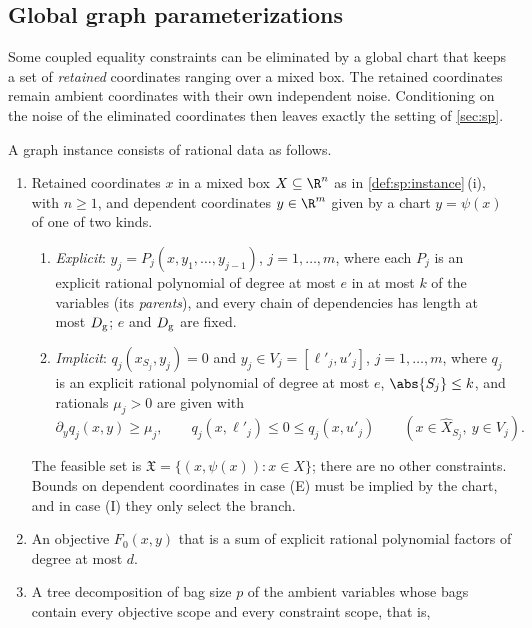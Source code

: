 \subsection{Global graph parameterizations}\label{sec:con:graph}

Some coupled equality constraints can be eliminated by a global chart that
keeps a set of \emph{retained} coordinates ranging over a mixed box. The
retained coordinates remain ambient coordinates with their own independent
noise. Conditioning on the noise of the eliminated coordinates then leaves
exactly the setting of \cref{sec:sp}.

\begin{definition}\label{def:con:graph}
A graph instance consists of rational data as follows.
\begin{enumerate}[label=(\roman*)]
\item Retained coordinates $x$ in a mixed box $X\subseteq\R^n$ as in
\cref{def:sp:instance}\,(i), with $n\ge1$, and dependent coordinates
$y\in\R^m$ given by a chart $y=\psi(x)$ of one of two kinds.
\begin{enumerate}[label=(\Alph*)]
\item[(E)] \emph{Explicit}: $y_j=P_j(x,y_1,\dots,y_{j-1})$, $j=1,\dots,m$,
where each $P_j$ is an explicit rational polynomial of degree at most $e$
in at most $k$ of the variables (its \emph{parents}), and every chain of
dependencies has length at most $D_{\rm g}$; $e$ and $D_{\rm g}$ are fixed.
\item[(I)] \emph{Implicit}: $q_j(x_{S_j},y_j)=0$ and $y_j\in V_j=[\ell'_j,u'_j]$,
$j=1,\dots,m$, where $q_j$ is an explicit rational polynomial of degree at
most $e$, $\abs{S_j}\le k$, and rationals $\mu_j>0$ are given with
\begin{equation}\label{eq:con:bracket}
 \partial_yq_j(x,y)\ge\mu_j,\qquad q_j(x,\ell'_j)\le0\le q_j(x,u'_j)
 \qquad(x\in\widehat X_{S_j},\ y\in V_j).
\end{equation}
\end{enumerate}
The feasible set is $\mathfrak X=\{(x,\psi(x)):x\in X\}$; there are no other
constraints. Bounds on dependent coordinates in case (E) must be implied by
the chart, and in case (I) they only select the branch.
\item An objective $F_0(x,y)$ that is a sum of explicit rational polynomial
factors of degree at most $d$.
\item A tree decomposition of bag size $p$ of the ambient variables whose
bags contain every objective scope and every constraint scope, that is,

\end{enumerate}
\end{definition}
